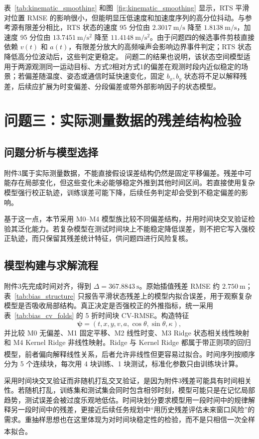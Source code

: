 \documentclass{cumcmthesis}
\newcommand{\upcite}[1]{\textsuperscript{\cite{#1}}}
\begin{document}
表~\ref{tab:kinematic_smoothing} 和图~\ref{fig:kinematic_smoothing} 显示，RTS 平滑对位置 RMSE 的影响很小，但能明显压低速度和加速度序列的高分位抖动。与参考源有限差分相比，RTS 状态的速度 95 分位由 $2.3017\ \mathrm{m/s}$ 降至 $1.8138\ \mathrm{m/s}$，加速度 95 分位由 $13.7451\ \mathrm{m/s^2}$ 降至 $11.4148\ \mathrm{m/s^2}$。由于问题四的候选事件剪枝直接依赖 $v(t)$ 和 $a(t)$，有限差分放大的高频噪声会影响边界事件判定；RTS 状态降低高分位波动后，这些判定更稳定。
问题二的结果也说明，该状态空间模型适用于两源观测同一运动目标、方式2相对方式1的偏差在观测时段内近似稳定的场景；若偏差随温度、姿态或通信时延快速变化，固定 $b_x,b_y$ 状态将不足以解释残差，后续应扩展为时变偏差、分段偏差或带外部影响因子的状态模型。

\section{问题三：实际测量数据的残差结构检验}
\subsection{问题分析与模型选择}
附件3属于实际测量数据，不能直接假设误差结构仍然是固定平移偏差。残差中可能存在局部变化，但这些变化未必能够稳定外推到其他时间区间。若直接使用复杂模型强行校正轨迹，训练误差可能下降，后续任务判定却会受到不稳定偏差的影响。

基于这一点，本节采用 M0--M4 模型族比较不同偏差结构，并用时间块交叉验证检验其泛化能力。若复杂模型在测试时间块上不能稳定降低误差，则不把它写入强校正轨迹，而只保留其残差统计特征，供问题四进行风险复核。

\subsection{模型构建与求解流程}
附件3先完成时间对齐，得到 $\Delta=367.8843\ \mathrm{s}$。原始插值残差 RMSE 约 $2.750\ \mathrm{m}$；表~\ref{tab:bias_structure} 只报告平滑状态残差上的模型内拟合误差，用于观察复杂模型是否吸收局部结构。真正决定是否强校正的外推指标，统一采用表~\ref{tab:bias_cv_folds} 的 5 折时间块 CV-RMSE。构造特征
\[
  \boldsymbol{\psi}=(t,x,y,v,a,\cos\theta,\sin\theta,\kappa),
\]
并比较 M0 无偏差、M1 固定平移、M2 线性时变、M3 Ridge 状态相关线性映射和 M4 Kernel Ridge 非线性映射。Ridge 与 Kernel Ridge 都属于带正则项的回归模型，前者偏向解释线性关系，后者允许非线性但更容易过拟合\upcite{hastie,scholkopf}。时间序列按顺序分为 5 个连续块，每次用 4 块训练、1 块测试，标准化参数只由训练块计算。

采用时间块交叉验证而非随机打乱交叉验证，是因为附件3残差可能具有时间相关性。若随机打乱，训练集和测试集会同时包含相邻时刻，模型可能只是在记忆局部趋势，测试误差会被过度乐观地低估。时间块划分要求模型用一段时间中的规律解释另一段时间中的残差，更接近后续任务规划中“用历史残差评估未来窗口风险”的需求。重抽样思想也在这里体现为对时间块稳定性的检验，而不是只相信一次全样本拟合\upcite{efron}。
\end{document}
